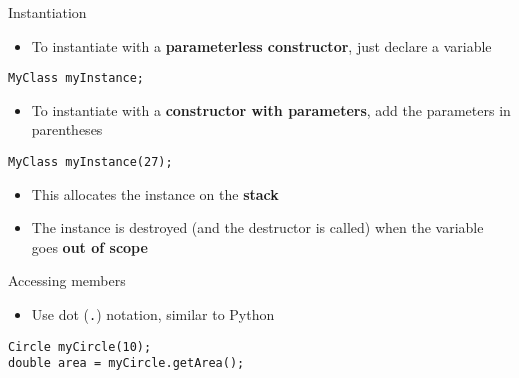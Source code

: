 \begin{frame}[fragile]{Instantiation}
    \begin{itemize}
        \item To instantiate with a \textbf{parameterless constructor}, just declare a variable
    \end{itemize}
    \begin{lstlisting}
MyClass myInstance;
    \end{lstlisting}
    \begin{itemize}
        \item To instantiate with a \textbf{constructor with parameters}, add the parameters in parentheses
    \end{itemize}
    \begin{lstlisting}
MyClass myInstance(27);
    \end{lstlisting}
    \begin{itemize}
        \item This allocates the instance on the \textbf{stack}
        \item The instance is destroyed (and the destructor is called) when the variable goes \textbf{out of scope}
    \end{itemize}
\end{frame}

\begin{frame}[fragile]{Accessing members}
    \begin{itemize}
        \item Use dot (\lstinline{.}) notation, similar to Python
    \end{itemize}
    \begin{lstlisting}
Circle myCircle(10);
double area = myCircle.getArea();
    \end{lstlisting}
\end{frame}
